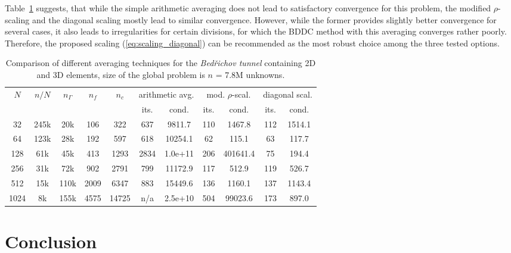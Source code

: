 Table~\ref{tab:tunnel_averaging} suggests, that while the simple arithmetic
averaging does not lead to satisfactory convergence for this problem, the
modified $\rho$-scaling and the diagonal scaling mostly lead to similar
convergence. However, while the former provides slightly better convergence
for several cases, it also leads to irregularities for certain divisions, for
which the BDDC method with this averaging converges rather poorly. Therefore,
the proposed scaling (\ref{eq:scaling_diagonal}) can be recommended as the
most robust choice among the three tested options.

\begin{table}[ptbh]
\begin{center}
\begin{tabular}
[c]{|cc|ccc|cc|cc|cc|}\hline
\multirow{2}{*}{$N$} & \multirow{2}{*}{$n/N$} &
\multirow{2}{*}{$n_{\Gamma}$} & \multirow{2}{*}{$n_f$} &
\multirow{2}{*}{$n_c$} & \multicolumn{2}{c|}{arithmetic avg.} &
\multicolumn{2}{c|}{mod. $\rho$-scal.} & \multicolumn{2}{c|}{diagonal scal.}\\
&  &  &  &  & its. & cond. & its. & cond. & its. & cond.\\\hline
32 & 245k & 20k & 106 & 322 & 637 & 9811.7 & 110 & 1467.8 & 112 & 1514.1\\
64 & 123k & 28k & 192 & 597 & 618 & 10254.1 & 62 & 115.1 & 63 & 117.7\\
128 & 61k & 45k & 413 & 1293 & 2834 & 1.0e+11 & 206 & 401641.4 & 75 & 194.4\\
256 & 31k & 72k & 902 & 2791 & 799 & 11172.9 & 117 & 512.9 & 119 & 526.7\\
512 & 15k & 110k & 2009 & 6347 & 883 & 15449.6 & 136 & 1160.1 & 137 & 1143.4\\
1024 & 8k & 155k & 4575 & 14725 & n/a & 2.5e+10 & 504 & 99023.6 & 173 &
897.0\\\hline
\end{tabular}
\end{center}
\caption{\label{tab:tunnel_averaging}
Comparison of different averaging techniques for the
\emph{Bed\v{r}ichov tunnel} containing 2D and 3D elements, size of the global
problem is $n$ = 7.8M unknowns.}
\end{table}


\section{Conclusion}

\label{sec:conclusion}

